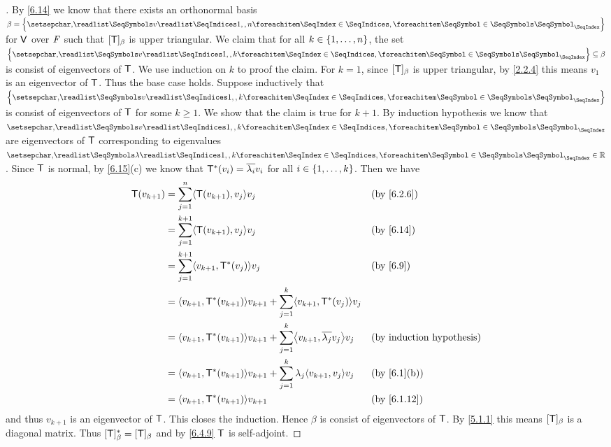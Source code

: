\begin{proof}[]
  By \cref{6.14} we know that there exists an orthonormal basis \(\beta = \set{\seq{v}{1,,n}}\) for \(\mathsf{V}\) over \(\mathit{F}\) such that \([\mathsf{T}]_{\beta}\) is upper triangular.
  We claim that for all \(k \in \left\lbrace1, \dots, n\right\rbrace\), the set \(\set{\seq{v}{1,,k}} \subseteq \beta\) is consist of eigenvectors of \(\mathsf{T}\).
  We use induction on \(k\) to proof the claim.
  For \(k = 1\), since \([\mathsf{T}]_{\beta}\) is upper triangular, by \cref{2.2.4} this means \(v_1\) is an eigenvector of \(\mathsf{T}\).
  Thus the base case holds.
  Suppose inductively that \(\set{\seq{v}{1,,k}}\) is consist of eigenvectors of \(\mathsf{T}\) for some \(k \geq 1\).
  We show that the claim is true for \(k + 1\).
  By induction hypothesis we know that \(\seq{v}{1,,k}\) are eigenvectors of \(\mathsf{T}\) corresponding to eigenvalues \(\seq{\lambda}{1,,k} \in \R\).
  Since \(\mathsf{T}\) is normal, by \cref{6.15}(c) we know that \(\mathsf{T}^*(v_i) = \overline{\lambda_i} v_i\) for all \(i \in \left\lbrace1, \dots, k\right\rbrace\).
  Then we have
  \begin{align*}
    \T(v_{k + 1}) & = \sum_{j = 1}^n \inn{\T(v_{k + 1}), v_j} v_j                                                           &  & \text{(by \cref{6.2.6})}         \\
                  & = \sum_{j = 1}^{k + 1} \inn{\T(v_{k + 1}), v_j} v_j                                                     &  & \text{(by \cref{6.14})}          \\
                  & = \sum_{j = 1}^{k + 1} \inn{v_{k + 1}, \T^*(v_j)} v_j                                                   &  & \text{(by \cref{6.9})}           \\
                  & = \inn{v_{k + 1}, \T^*(v_{k + 1})} v_{k + 1} + \sum_{j = 1}^k \inn{v_{k + 1}, \T^*(v_j)} v_j                                                  \\
                  & = \inn{v_{k + 1}, \T^*(v_{k + 1})} v_{k + 1} + \sum_{j = 1}^k \inn{v_{k + 1}, \conj{\lambda_j} v_j} v_j &  & \text{(by induction hypothesis)} \\
                  & = \inn{v_{k + 1}, \T^*(v_{k + 1})} v_{k + 1} + \sum_{j = 1}^k \lambda_j \inn{v_{k + 1}, v_j} v_j        &  & \text{(by \cref{6.1}(b))}        \\
                  & = \inn{v_{k + 1}, \T^*(v_{k + 1})} v_{k + 1}                                                            &  & \text{(by \cref{6.1.12})}
  \end{align*}
  and thus \(v_{k + 1}\) is an eigenvector of \(\mathsf{T}\).
  This closes the induction.
  Hence \(\beta\) is consist of eigenvectors of \(\mathsf{T}\).
  By \cref{5.1.1} this means \([\mathsf{T}]_{\beta}\) is a diagonal matrix.
  Thus \([\mathsf{T}]_{\beta}^* = [\mathsf{T}]_{\beta}\) and by \cref{6.4.9} \(\mathsf{T}\) is self-adjoint.
\end{proof}

